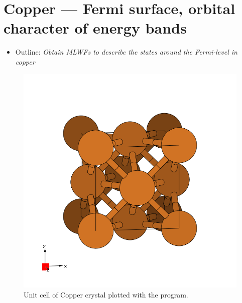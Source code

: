 \section{Copper --- Fermi surface, orbital character of energy bands}
\label{sec4:copper}
\begin{itemize}
\item Outline: {\it Obtain MLWFs to describe the states around the Fermi-level in copper}
\end{itemize}


\begin{figure}[h!]
\centering
\includegraphics[width=0.25\columnwidth,trim={45pt 45pt 55pt 55pt},clip]{figure/example04/copper_crystal.png}
\caption{Unit cell of Copper crystal plotted with the \xcrysden{} program.}
\label{fig4.0}
\end{figure}

